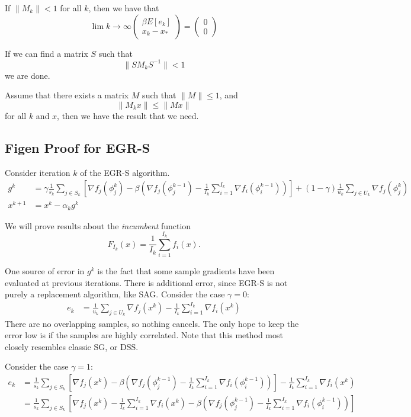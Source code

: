 \documentclass[11pt]{article}
\begin{document}
If $\|M_k\| < 1$ for all $k$, then we have that 
\[ 
\lim{k \rightarrow \infty}
\begin{pmatrix}
	\beta E[e_k] \\
	x_k-x_\ast 
\end{pmatrix}
= 
\begin{pmatrix}
	0\\
	0
\end{pmatrix}
\]
 
 
 
If we can find a matrix $S$ such that 
\[
\| S M_k S^{-1} \| < 1 
\]
we are done. 
 

Assume that there exists a matrix $M$ such that $\|M\| \leq 1$, and
\[
\|M_k x\| \leq \|M x \| 
\]
for all $k$ and $x$, then we have the result that we need.


\subsection{Figen Proof for EGR-S}

Consider iteration $k$ of the EGR-S algorithm. 
\begin{align*}
	g^k &= \gamma \frac{1}{s_k} \sum_{j \in S_k} \left[  \nabla f_j(\phi_j^{k}) - \beta ( \nabla f_j(\phi^{k-1}_j) - \frac{1}{I_{k}} \sum_{i = 1}^{I_{k}}  \nabla f_i (\phi_i^{k-1}))\right] +(1-\gamma) \frac{1}{u_k} \sum_{j \in U_k}  \nabla f_j(\phi_j^{k})\\
	x^{k+1} &= x^k - \alpha_k g^k 
\end{align*}

We will prove results about the \textit{incumbent} function 
\begin{equation}
	F_{I_k}(x) = \frac{1}{I_k} \sum_{i=1}^{I_k} f_i(x). 
\end{equation}

One source of error in $g^k$ is the fact that some sample gradients have been evaluated at previous iterations. There is additional error, since EGR-S is not purely a replacement algorithm, like SAG. Consider the case $\gamma=0$: 
\begin{align*}
	e_k &= \frac{1}{u_k} \sum_{j \in U_k}  \nabla f_j(x^{k}) - \frac{1}{I_k} \sum_{i = 1}^{I_{k}}  \nabla f_i(x^{k}) 
\end{align*}
There are no overlapping samples, so nothing cancels. The only hope to keep the error low is if the samples are highly correlated. Note that this method most closely resembles classic SG, or DSS.

Consider the case $\gamma=1$: 
\begin{align*}
	e_k &= \frac{1}{s_k} \sum_{j \in S_k} \left[  \nabla f_j(x^{k}) - \beta \left( \nabla f_j(\phi^{k-1}_j) - \frac{1}{I_{k}} \sum_{i = 1}^{I_{k}}  \nabla f_i (\phi_i^{k-1})\right)\right] - \frac{1}{I_k} \sum_{i = 1}^{I_{k}}  \nabla f_i(x^{k}) \\
	&= \frac{1}{s_k} \sum_{j \in S_k} \left[  \nabla f_j(x^{k}) - \frac{1}{I_k} \sum_{i = 1}^{I_{k}}  \nabla f_i(x^{k}) - \beta \left( \nabla f_j(\phi^{k-1}_j) - \frac{1}{I_{k}} \sum_{i = 1}^{I_{k}}  \nabla f_i (\phi_i^{k-1})\right)\right] 
\end{align*}
\end{document}
